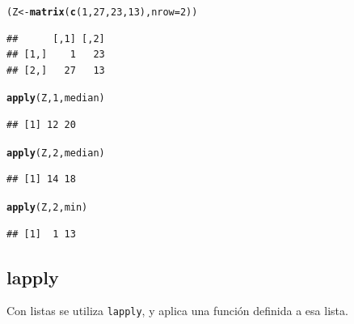 \documentclass{config/apuntes}\usepackage[]{graphicx}\usepackage[]{xcolor}
\makeatletter
\newcommand{\hlnum}[1]{\textcolor[rgb]{0.686,0.059,0.569}{#1}}%
\newcommand{\hldef}[1]{\textcolor[rgb]{0.345,0.345,0.345}{#1}}%
\newcommand{\hlkwb}[1]{\textcolor[rgb]{0.69,0.353,0.396}{#1}}%
\newcommand{\hlkwc}[1]{\textcolor[rgb]{0.333,0.667,0.333}{#1}}%
\newcommand{\hlkwd}[1]{\textcolor[rgb]{0.737,0.353,0.396}{\textbf{#1}}}%
\newenvironment{kframe}{%
 \def\at@end@of@kframe{}%
 \ifinner\ifhmode%
  \def\at@end@of@kframe{\end{minipage}}%
  \begin{minipage}{\columnwidth}%
 \fi\fi%
 \def\FrameCommand##1{\hskip\@totalleftmargin \hskip-\fboxsep
 \colorbox{shadecolor}{##1}\hskip-\fboxsep
     \hskip-\linewidth \hskip-\@totalleftmargin \hskip\columnwidth}%
 \MakeFramed {\advance\hsize-\width
   \@totalleftmargin\z@ \linewidth\hsize
   \@setminipage}}%
 {\par\unskip\endMakeFramed%
 \at@end@of@kframe}
\newenvironment{knitrout}{}{} %
\newcommand{\code}[1]{\texttt{#1}}
\makeatother
\begin{document}
\begin{knitrout}
\color{fgcolor}\begin{kframe}
\begin{alltt}
\hldef{(Z} \hlkwb{<-} \hlkwd{matrix}\hldef{(}\hlkwd{c}\hldef{(}\hlnum{1}\hldef{,} \hlnum{27}\hldef{,} \hlnum{23}\hldef{,} \hlnum{13}\hldef{),} \hlkwc{nrow} \hldef{=} \hlnum{2}\hldef{))}
\end{alltt}
\begin{verbatim}
##      [,1] [,2]
## [1,]    1   23
## [2,]   27   13
\end{verbatim}
\begin{alltt}
\hlkwd{apply}\hldef{(Z,} \hlnum{1}\hldef{, median)}
\end{alltt}
\begin{verbatim}
## [1] 12 20
\end{verbatim}
\begin{alltt}
\hlkwd{apply}\hldef{(Z,} \hlnum{2}\hldef{, median)}
\end{alltt}
\begin{verbatim}
## [1] 14 18
\end{verbatim}
\begin{alltt}
\hlkwd{apply}\hldef{(Z,} \hlnum{2}\hldef{, min)}
\end{alltt}
\begin{verbatim}
## [1]  1 13
\end{verbatim}
\end{kframe}
\end{knitrout}

\subsection{lapply}
Con listas se utiliza \code{lapply}, y aplica una función definida a esa lista. 
\end{document}

